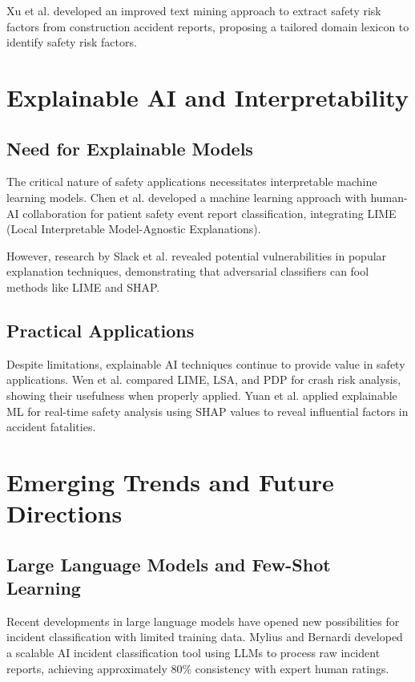 \documentclass[11pt, titlepage, bibliography=totoc]{scrreprt}
\begin{document}
Xu et al. \cite{xu2021} developed an improved text mining approach to extract safety risk factors from construction accident reports, proposing a tailored domain lexicon to identify safety risk factors.

\section{Explainable AI and Interpretability}

\subsection{Need for Explainable Models}
The critical nature of safety applications necessitates interpretable machine learning models. Chen et al. \cite{chen2024} developed a machine learning approach with human-AI collaboration for patient safety event report classification, integrating LIME (Local Interpretable Model-Agnostic Explanations).

However, research by Slack et al. \cite{slack2020} revealed potential vulnerabilities in popular explanation techniques, demonstrating that adversarial classifiers can fool methods like LIME and SHAP.

\subsection{Practical Applications}
Despite limitations, explainable AI techniques continue to provide value in safety applications. Wen et al. \cite{wen2022} compared LIME, LSA, and PDP for crash risk analysis, showing their usefulness when properly applied. Yuan et al. \cite{yuan2022} applied explainable ML for real-time safety analysis using SHAP values to reveal influential factors in accident fatalities.

\section{Emerging Trends and Future Directions}

\subsection{Large Language Models and Few-Shot Learning}
Recent developments in large language models have opened new possibilities for incident classification with limited training data. Mylius and Bernardi \cite{mylius2025} developed a scalable AI incident classification tool using LLMs to process raw incident reports, achieving approximately 80\% consistency with expert human ratings.
\end{document}
